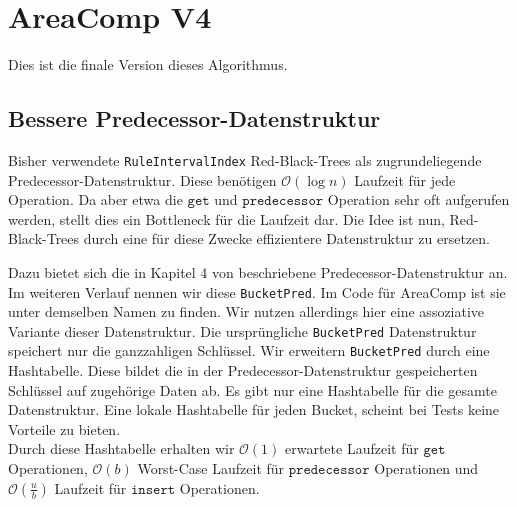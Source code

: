 



\section{AreaComp V4}
\label{v4}

Dies ist die finale Version dieses Algorithmus. 

\subsection{Bessere Predecessor-Datenstruktur}

Bisher verwendete \texttt{RuleIntervalIndex} Red-Black-Trees als zugrundeliegende Predecessor-Datenstruktur. Diese benötigen $\mathcal{O}(\log n)$ Laufzeit für jede Operation. Da aber etwa die $\texttt{get}$ und $\texttt{predecessor}$ Operation sehr oft aufgerufen werden, stellt dies ein Bottleneck für die Laufzeit dar.
Die Idee ist nun, Red-Black-Trees durch eine für diese Zwecke effizientere Datenstruktur zu ersetzen.

Dazu bietet sich die in Kapitel 4 von \cite{dinklage_engineering_2021} beschriebene  Predecessor-Datenstruktur an. Im weiteren Verlauf nennen wir diese \texttt{BucketPred}. Im Code für AreaComp ist sie unter demselben Namen zu finden. Wir nutzen allerdings hier eine assoziative Variante dieser Datenstruktur. Die ursprüngliche \texttt{BucketPred} Datenstruktur speichert nur die ganzzahligen Schlüssel. Wir erweitern \texttt{BucketPred} durch eine Hashtabelle. Diese bildet die in der Predecessor-Datenstruktur gespeicherten Schlüssel auf zugehörige Daten ab. Es gibt nur eine Hashtabelle für die gesamte Datenstruktur.   
Eine lokale Hashtabelle für jeden Bucket, scheint bei Tests keine Vorteile zu bieten.\\
Durch diese Hashtabelle erhalten wir $\mathcal{O}(1)$ erwartete Laufzeit für $\texttt{get}$ Operationen, $\mathcal{O}(b)$ Worst-Case Laufzeit für $\texttt{predecessor}$ Operationen und $\mathcal{O}(\tfrac{u}{b})$ Laufzeit für $\texttt{insert}$ Operationen. 

